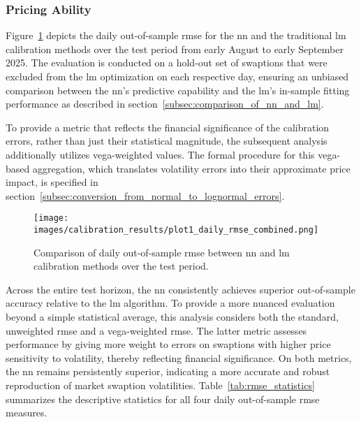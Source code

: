 \subsubsection{Pricing Ability}
Figure~\ref{fig:daily_rmse_comparison} depicts the daily out-of-sample \ac{rmse} for the \ac{nn} and the traditional \ac{lm} calibration methods over the test period from early August to early September 2025. The evaluation is conducted on a hold-out set of swaptions that were excluded from the \ac{lm} optimization on each respective day, ensuring an unbiased comparison between the \ac{nn}'s predictive capability and the \ac{lm}'s in-sample fitting performance as described in section~\ref{subsec:comparison_of_nn_and_lm}.

To provide a metric that reflects the financial significance of the calibration errors, rather than just their statistical magnitude, the subsequent analysis additionally utilizes vega-weighted values. The formal procedure for this vega-based aggregation, which translates volatility errors into their approximate price impact, is specified in section~\ref{subsec:conversion_from_normal_to_lognormal_errors}.

\begin{figure}[H]
	\centering
	\texttt{[image: images/calibration\_results/plot1\_daily\_rmse\_combined.png]}
	\caption{Comparison of daily out-of-sample \ac{rmse} between \ac{nn} and \ac{lm} calibration methods over the test period.}
	\label{fig:daily_rmse_comparison}
\end{figure}

Across the entire test horizon, the \ac{nn} consistently achieves superior out-of-sample accuracy relative to the \ac{lm} algorithm. To provide a more nuanced evaluation beyond a simple statistical average, this analysis considers both the standard, unweighted \ac{rmse} and a vega-weighted \ac{rmse}. The latter metric assesses performance by giving more weight to errors on swaptions with higher price sensitivity to volatility, thereby reflecting financial significance. On both metrics, the \ac{nn} remains persistently superior, indicating a more accurate and robust reproduction of market swaption volatilities. Table~\ref{tab:rmse_statistics} summarizes the descriptive statistics for all four daily out-of-sample \ac{rmse} measures.

